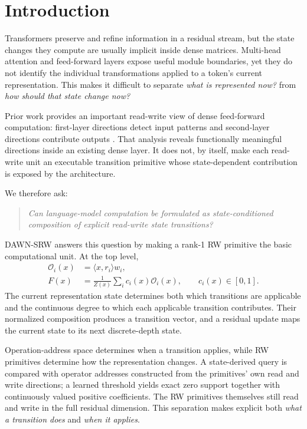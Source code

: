 \documentclass{article}
\newcommand{\DAWN}{DAWN-SRW}
\newcommand{\op}{\mathcal{O}}
\begin{document}
\section{Introduction}
\label{sec:introduction}

Transformers preserve and refine information in a residual stream, but the
state changes they compute are usually implicit inside dense matrices.
Multi-head attention and feed-forward layers expose useful module boundaries,
yet they do not identify the individual transformations applied to a token's
current representation. This makes it difficult to separate \emph{what is
represented now?} from \emph{how should that state change now?}

Prior work provides an important read-write view of dense feed-forward
computation: first-layer directions detect input patterns and second-layer
directions contribute outputs \cite{geva2021transformer}. That analysis reveals
functionally meaningful directions inside an existing dense layer. It does not,
by itself, make each read-write unit an executable transition primitive whose
state-dependent contribution is exposed by the architecture.

We therefore ask:
\begin{quote}
\emph{Can language-model computation be formulated as state-conditioned
composition of explicit read-write state transitions?}
\end{quote}
\DAWN{} answers this question by making a rank-1 RW primitive the basic
computational unit. At the top level,
\begin{align}
\op_i(x)&=\langle x,r_i\rangle w_i,
\label{eq:intro_operator}\\
F(x)&=\frac{1}{Z(x)}\sum_i c_i(x)\op_i(x),
\qquad c_i(x)\in[0,1].
\label{eq:intro_field}
\end{align}
The current representation state determines both which transitions are
applicable and the continuous degree to which each applicable transition
contributes. Their normalized composition produces a transition vector, and a
residual update maps the current state to its next discrete-depth state.

Operation-address space determines when a transition applies, while RW
primitives determine how the representation changes. A state-derived query is
compared with
operator addresses constructed from the primitives' own read and write
directions; a learned threshold yields exact zero support together with
continuously valued positive coefficients. The RW primitives themselves still
read and write in the full residual dimension. This separation makes explicit
both \emph{what a transition does} and \emph{when it applies}.
\end{document}
